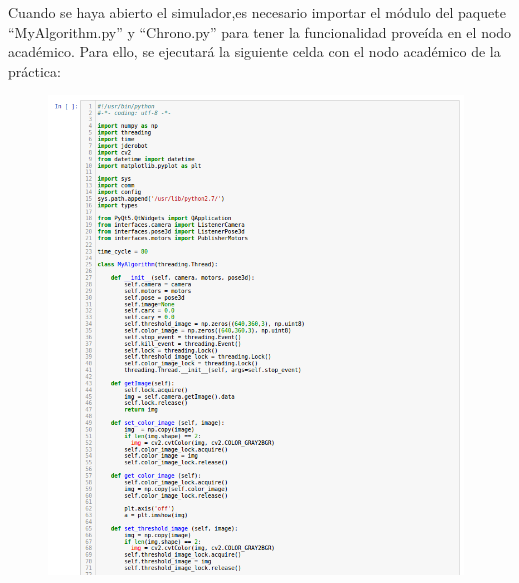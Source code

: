 Cuando se haya abierto el simulador,es necesario importar el módulo del paquete ``MyAlgorithm.py'' y ``Chrono.py'' para tener la funcionalidad proveída en el nodo académico. Para ello, se ejecutará la siguiente celda con el nodo académico de la práctica:

\begin{figure}[H]
    \centering
	\begin{minipage}[h]{.48\linewidth}
    \centering
    \includegraphics[width=0.98\textwidth]{figures/celda_nodo_chrono1.png}
	 \end{minipage}
    \begin{minipage}[h]{.48\linewidth}
    \centering

\end{minipage}
\end{figure}

